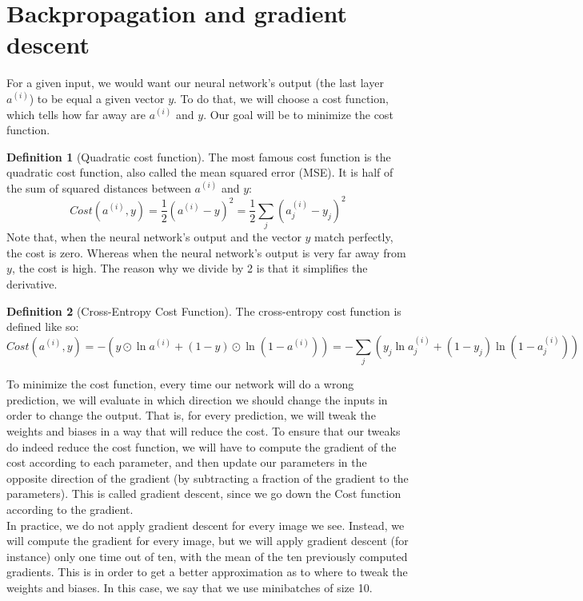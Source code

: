 \documentclass{article}
\theoremstyle{definition}
\newtheorem{definition}{Definition}[section]
\theoremstyle{remark}
\theoremstyle{example}
\begin{document}
\section{Backpropagation and gradient descent}

For a given input, we would want our neural network's output (the last layer $a^{(i)}$) to be equal a given vector $y$. To do that, we will choose a cost function, which tells how far away are $a^{(i)}$ and $y$. Our goal will be to minimize the cost function.

\begin{definition}[Quadratic cost function]
    The most famous cost function is the quadratic cost function, also called the mean squared error (MSE). It is half of the sum of squared distances between $a^{(i)}$ and $y$:
        $$Cost(a^{(i)}, y) = \frac{1}{2}(a^{(i)} - y)^2 = \frac{1}{2} \sum_j (a^{(i)}_j - y_j)^2$$
    Note that, when the neural network's output and the vector $y$ match perfectly, the cost is zero. Whereas when the neural network's output is very far away from $y$, the cost is high. The reason why we divide by 2 is that it simplifies the derivative.
\end{definition}

\begin{definition}[Cross-Entropy Cost Function]
    The cross-entropy cost function is defined like so:
        $$Cost(a^{(i)}, y) = -(y \odot \ln a^{(i)} + (1 - y) \odot \ln (1 - a^{(i)})) = -\sum_j (y_j \ln a^{(i)}_j + (1 - y_j) \ln (1 - a^{(i)}_j))$$
\end{definition}

To minimize the cost function, every time our network will do a wrong prediction, we will evaluate in which direction we should change the inputs in order to change the output. That is, for every prediction, we will tweak the weights and biases in a way that will reduce the cost. To ensure that our tweaks do indeed reduce the cost function, we will have to compute the gradient of the cost according to each parameter, and then update our parameters in the opposite direction of the gradient (by subtracting a fraction of the gradient to the parameters). This is called gradient descent, since we go down the Cost function according to the gradient.\\

In practice, we do not apply gradient descent for every image we see. Instead, we will compute the gradient for every image, but we will apply gradient descent (for instance) only one time out of ten, with the mean of the ten previously computed gradients. This is in order to get a better approximation as to where to tweak the weights and biases. In this case, we say that we use minibatches of size 10.\\
\end{document}
